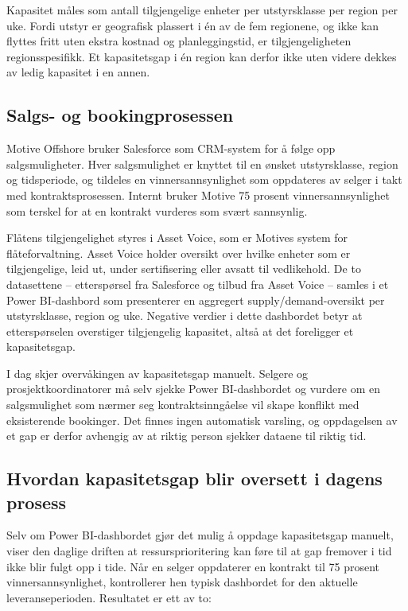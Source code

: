 \documentclass[a4paper,11pt]{article}
\begin{document}
Kapasitet måles som antall tilgjengelige enheter per utstyrsklasse per region per uke. Fordi utstyr er geografisk plassert i én av de fem regionene, og ikke kan flyttes fritt uten ekstra kostnad og planleggingstid, er tilgjengeligheten regionsspesifikk. Et kapasitetsgap i én region kan derfor ikke uten videre dekkes av ledig kapasitet i en annen.

\subsection{Salgs- og bookingprosessen}

Motive Offshore bruker Salesforce som CRM-system for å følge opp salgsmuligheter. Hver salgsmulighet er knyttet til en ønsket utstyrsklasse, region og tidsperiode, og tildeles en vinnersannsynlighet som oppdateres av selger i takt med kontraktsprosessen. Internt bruker Motive 75 prosent vinnersannsynlighet som terskel for at en kontrakt vurderes som svært sannsynlig.

Flåtens tilgjengelighet styres i Asset Voice, som er Motives system for flåteforvaltning. Asset Voice holder oversikt over hvilke enheter som er tilgjengelige, leid ut, under sertifisering eller avsatt til vedlikehold. De to datasettene – etterspørsel fra Salesforce og tilbud fra Asset Voice – samles i et Power BI-dashbord som presenterer en aggregert supply/demand-oversikt per utstyrsklasse, region og uke. Negative verdier i dette dashbordet betyr at etterspørselen overstiger tilgjengelig kapasitet, altså at det foreligger et kapasitetsgap.

I dag skjer overvåkingen av kapasitetsgap manuelt. Selgere og prosjektkoordinatorer må selv sjekke Power BI-dashbordet og vurdere om en salgsmulighet som nærmer seg kontraktsinngåelse vil skape konflikt med eksisterende bookinger. Det finnes ingen automatisk varsling, og oppdagelsen av et gap er derfor avhengig av at riktig person sjekker dataene til riktig tid.

\subsection{Hvordan kapasitetsgap blir oversett i dagens prosess}

Selv om Power BI-dashbordet gjør det mulig å oppdage kapasitetsgap manuelt, viser den daglige driften at ressursprioritering kan føre til at gap fremover i tid ikke blir fulgt opp i tide. Når en selger oppdaterer en kontrakt til 75 prosent vinnersannsynlighet, kontrollerer hen typisk dashbordet for den aktuelle leveranseperioden. Resultatet er ett av to:
\end{document}
